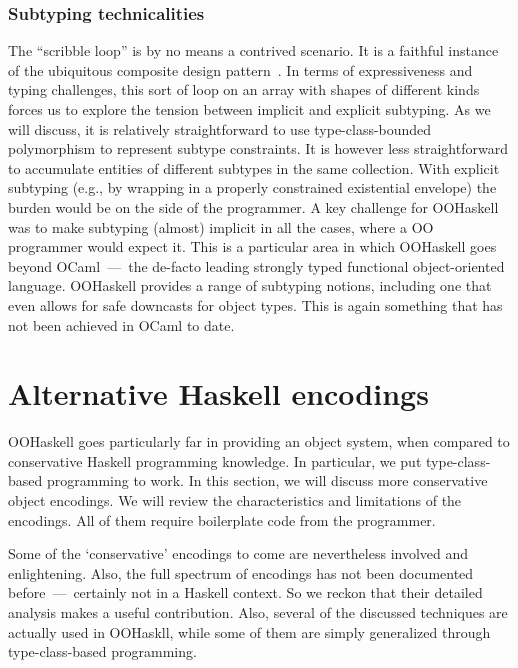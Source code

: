\documentclass{jfp}
\begin{document}
\subsubsection{Subtyping technicalities}

The ``scribble loop'' is by no means a contrived scenario. It is a
faithful instance of the ubiquitous composite design
pattern~\cite{GHJV94}. In terms of expressiveness and typing
challenges, this sort of loop on an array with shapes of different
kinds forces us to explore the tension between implicit and explicit
subtyping. As we will discuss, it is relatively straightforward to use
type-class-bounded polymorphism to represent subtype constraints. It
is however less straightforward to accumulate entities of different
subtypes in the same collection. With explicit subtyping (e.g., by
wrapping in a properly constrained existential envelope) the burden
would be on the side of the programmer. A key challenge for OOHaskell
was to make subtyping (almost) implicit in all the cases, where a OO
programmer would expect it. This is a particular area in which
OOHaskell goes beyond OCaml~\cite{OCaml}---~the de-facto leading
strongly typed functional object-oriented language. OOHaskell provides
a range of subtyping notions, including one that even allows for safe
downcasts for object types. This is again something that has not been
achieved in OCaml to date.






\section{Alternative Haskell encodings}
\label{S:poor}

OOHaskell goes particularly far in providing an object system, when
compared to conservative Haskell programming knowledge. In particular,
we put type-class-based programming to work. In this section, we will
discuss more conservative object encodings. We will review the
characteristics and limitations of the encodings. All of them require
boilerplate code from the programmer.

Some of the `conservative' encodings to come are nevertheless involved
and enlightening. Also, the full spectrum of encodings has not been
documented before~---~certainly not in a Haskell context. So we reckon
that their detailed analysis makes a useful contribution. Also,
several of the discussed techniques are actually used in OOHaskll,
while some of them are simply generalized through type-class-based
programming.
\end{document}
